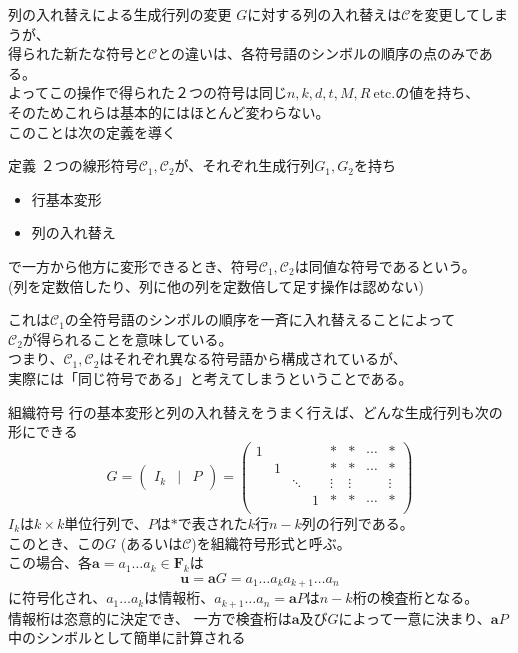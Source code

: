 \documentclass[dvipdfmx,10pt,jsarticle]{beamer}
\begin{document}
  \begin{frame}{列の入れ替えによる生成行列の変更}
    $G$に対する列の入れ替えは$\mathcal{C}$を変更してしまうが、 \\
    得られた新たな符号と$\mathcal{C}$との違いは、各符号語のシンボルの順序の点のみである。 \\
    よってこの操作で得られた２つの符号は同じ$n, k, d, t, M, R \ \text{etc.}$の値を持ち、 \\
    そのためこれらは基本的にはほとんど変わらない。 \\
    このことは次の定義を導く
    \begin{block}{定義}
    ２つの線形符号$\mathcal{C}_1, \mathcal{C}_2$が、それぞれ生成行列$G_1, G_2$を持ち
    \begin{itemize}
      \item 行基本変形
      \item 列の入れ替え
    \end{itemize}
    で一方から他方に変形できるとき、符号$\mathcal{C}_1, \mathcal{C}_2$は同値な符号であるという。 \\
    (列を定数倍したり、列に他の列を定数倍して足す操作は認めない)
    \end{block}

    これは$\mathcal{C}_1$の全符号語のシンボルの順序を一斉に入れ替えることによって \\
    $\mathcal{C}_2$が得られることを意味している。\\
    つまり、$\mathcal{C}_1, \mathcal{C}_2$はそれぞれ異なる符号語から構成されているが、\\ 
    実際には「同じ符号である」と考えてしまうということである。
  \end{frame}

  \begin{frame}{組織符号}
    行の基本変形と列の入れ替えをうまく行えば、どんな生成行列も次の形にできる
    \[ G = \begin{pmatrix}
        I_k & \mid & P
      \end{pmatrix} = \begin{pmatrix}
        1 &  &  &  & \ast & \ast & \cdots & \ast \\
          & 1 &  &  & \ast & \ast & \cdots & \ast \\
          &  & \ddots &  & \vdots & \vdots &  & \vdots \\
          &  &  & 1 & \ast & \ast & \cdots & \ast \\
      \end{pmatrix} \]
      $I_k$は$k \times k$単位行列で、$P$は$\ast$で表された$k$行$n-k$列の行列である。 \\
      このとき、この$G$ (あるいは$\mathcal{C}$)を組織符号形式と呼ぶ。  \\
      この場合、各$\mathbf{a} = a_1 \ldots a_k \in \mathbf{F}_k$は
      \[ \mathbf{u} = \mathbf{a} G = a_1 \ldots a_k a_{k+1} \ldots a_n \]
      に符号化され、$a_1 \ldots a_k$は情報桁、$a_{k+1} \ldots a_n = \mathbf{a} P$は$n - k$桁の検査桁となる。\\
    情報桁は恣意的に決定でき、 一方で検査桁は$\mathbf{a}$及び$G$によって一意に決まり、$\mathbf{a} P$中のシンボルとして簡単に計算される
  \end{frame}
\end{document}
